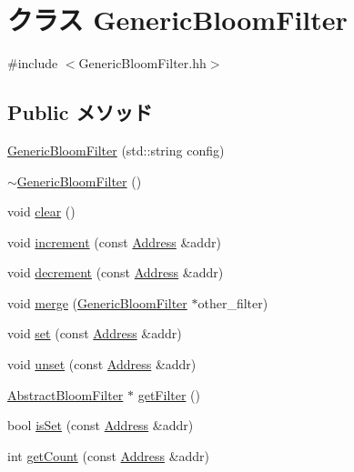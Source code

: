 \hypertarget{classGenericBloomFilter}{
\section{クラス GenericBloomFilter}
\label{classGenericBloomFilter}
}


{\ttfamily \#include $<$GenericBloomFilter.hh$>$}\subsection*{Public メソッド}
\begin{DoxyCompactItemize}
\item 
\hyperlink{classGenericBloomFilter_a4727c17091f00a566704555cd71963d1}{GenericBloomFilter} (std::string config)
\item 
\hyperlink{classGenericBloomFilter_aa54f36388bcade392a04a87cbcffcec1}{$\sim$GenericBloomFilter} ()
\item 
void \hyperlink{classGenericBloomFilter_ac8bb3912a3ce86b15842e79d0b421204}{clear} ()
\item 
void \hyperlink{classGenericBloomFilter_a3e860ad851b771ac3b6eeb1716eb56bc}{increment} (const \hyperlink{classAddress}{Address} \&addr)
\item 
void \hyperlink{classGenericBloomFilter_addb6b805abb8328082a24926f2bf8c84}{decrement} (const \hyperlink{classAddress}{Address} \&addr)
\item 
void \hyperlink{classGenericBloomFilter_a59f97f07ec5f7606df733144207567b6}{merge} (\hyperlink{classGenericBloomFilter}{GenericBloomFilter} $\ast$other\_\-filter)
\item 
void \hyperlink{classGenericBloomFilter_a2b666fae2a5c2b98bc5cba8e1333bcc9}{set} (const \hyperlink{classAddress}{Address} \&addr)
\item 
void \hyperlink{classGenericBloomFilter_a69b772787ea61467af679e3aa5406b41}{unset} (const \hyperlink{classAddress}{Address} \&addr)
\item 
\hyperlink{classAbstractBloomFilter}{AbstractBloomFilter} $\ast$ \hyperlink{classGenericBloomFilter_a6647c0f786a7ceddc8a0fff26702b841}{getFilter} ()
\item 
bool \hyperlink{classGenericBloomFilter_a4200ee289c3d941a4b209c4788f8087c}{isSet} (const \hyperlink{classAddress}{Address} \&addr)
\item 
int \hyperlink{classGenericBloomFilter_abb722634d5846105b673e9496df8d062}{getCount} (const \hyperlink{classAddress}{Address} \&addr)
\item 

\end{DoxyCompactItemize}
